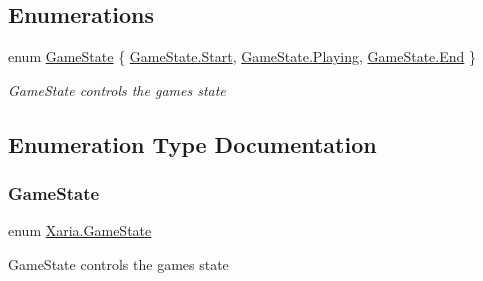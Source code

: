 \subsection*{Enumerations}
\begin{DoxyCompactItemize}
\item 
enum \hyperlink{namespaceXaria_a2c2420c982c39ab01bdb72f1d7d4aac7}{Game\+State} \{ \hyperlink{namespaceXaria_a2c2420c982c39ab01bdb72f1d7d4aac7aa6122a65eaa676f700ae68d393054a37}{Game\+State.\+Start}, 
\hyperlink{namespaceXaria_a2c2420c982c39ab01bdb72f1d7d4aac7ac9dbb2b7c84159b632d71e512eba8428}{Game\+State.\+Playing}, 
\hyperlink{namespaceXaria_a2c2420c982c39ab01bdb72f1d7d4aac7a87557f11575c0ad78e4e28abedc13b6e}{Game\+State.\+End}
 \}\begin{DoxyCompactList}\small\item\em Game\+State controls the game\textquotesingle{}s state \end{DoxyCompactList}
\end{DoxyCompactItemize}


\subsection{Enumeration Type Documentation}
\mbox{\label{namespaceXaria_a2c2420c982c39ab01bdb72f1d7d4aac7}} 
\subsubsection{\texorpdfstring{Game\+State}{GameState}}
{\footnotesize\ttfamily enum \hyperlink{namespaceXaria_a2c2420c982c39ab01bdb72f1d7d4aac7}{Xaria.\+Game\+State}\hspace{0.3cm}{\ttfamily [strong]}}



Game\+State controls the game\textquotesingle{}s state 

